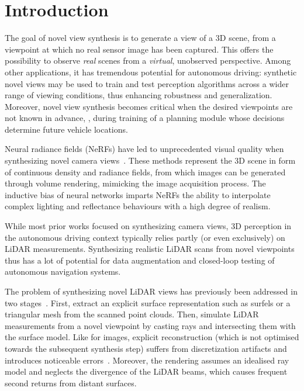 \section{Introduction}
\label{sec:intro}

The goal of novel view synthesis is to generate a view of a 3D scene, from a viewpoint at which no real sensor image has been captured. This offers the possibility to observe \emph{real} scenes from a \emph{virtual}, unobserved perspective. Among other applications, it has tremendous potential for autonomous driving: synthetic novel views may be used to train and test perception algorithms across a wider range of viewing conditions, thus enhancing robustness and generalization. Moreover, novel view synthesis becomes critical when the desired viewpoints are not known in advance, \eg, during training of a planning module whose decisions determine future vehicle locations.

Neural radiance fields (NeRFs) have led to unprecedented visual quality when synthesizing novel camera views~\cite{mildenhall2020nerf, barron2021mip, yu2021plenoxels, muller2022instant}. These methods represent the 3D scene in form of continuous density and radiance fields, from which images can be generated through volume rendering, mimicking the image acquisition process. The inductive bias of neural networks imparts NeRFs the ability to interpolate complex lighting and reflectance behaviours with a high degree of realism.

While most prior works focused on synthesizing camera views, 3D perception in the autonomous driving context typically relies partly (or even exclusively) on LiDAR measurements. Synthesizing realistic LiDAR scans from novel viewpoints thus has a lot of potential for data augmentation and closed-loop testing of autonomous navigation systems.

The problem of synthesizing novel LiDAR views has previously been addressed in two stages~\cite{manivasagam2020lidarsim}. First, extract an explicit surface representation such as surfels or a triangular mesh from the scanned point clouds. Then, simulate LiDAR measurements from a novel viewpoint by casting rays and intersecting them with the surface model.
Like for images, explicit reconstruction (which is not optimised towards the subsequent synthesis step) suffers from discretization artifacts and introduces noticeable errors~\cite{waechter2014let}. Moreover, the rendering assumes an idealised ray model and neglects the divergence of the LiDAR beams, which causes frequent second returns from distant surfaces. 

